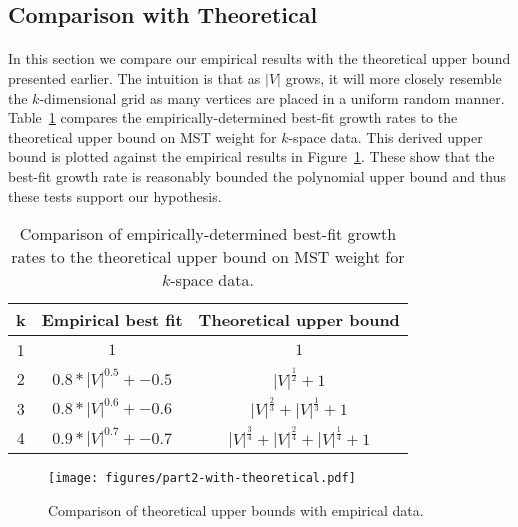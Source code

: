 
\subsection{Comparison with Theoretical}
\label{sec:part2:compare}
\paragraph{}
In this section we compare our empirical results with the theoretical upper
bound presented earlier. The intuition is that as $|V|$ grows, it will more
closely resemble the $k$-dimensional grid as many vertices are placed in a
uniform random manner.  Table~\ref{table:part2-comparison} compares the
empirically-determined best-fit growth rates to the theoretical upper bound on
MST weight for $k$-space data.  This derived upper bound is plotted against the
empirical results in Figure~\ref{fig:part2-with-theoretical}.  These show that
the best-fit growth rate is reasonably bounded the polynomial upper bound and
thus these tests support our hypothesis.

\begin{table}
\begin{tabular}{|c|c|c|}
\hline
k&Empirical best fit&Theoretical upper bound\\
\hline
1&$1$&$1$\\
2&$0.8*|V|^{0.5} + -0.5$&$|V|^{\frac{1}{2}} + 1$\\
3&$0.8*|V|^{0.6} + -0.6$&$|V|^{\frac{2}{3}} + |V|^{\frac{1}{3}} + 1$\\
4&$0.9*|V|^{0.7} + -0.7$&$|V|^{\frac{3}{4}} + |V|^{\frac{2}{4}} + |V|^{\frac{1}{4}} + 1$\\
\hline
\end{tabular}
\caption{Comparison of empirically-determined best-fit growth rates to the
  theoretical upper bound on MST weight for $k$-space data.}
\label{table:part2-comparison}
\end{table}

\begin{figure}[htb!]
\centering
\texttt{[image: figures/part2-with-theoretical.pdf]}
\caption{Comparison of theoretical upper bounds with empirical data.}
\label{fig:part2-with-theoretical}
\end{figure}
